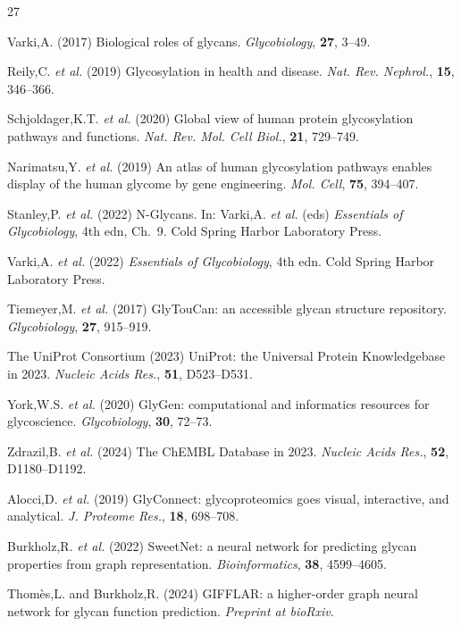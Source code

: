 \documentclass[11pt,a4paper]{ltjsarticle}
\begin{document}
\begin{thebibliography}{27}

Varki,A. (2017) Biological roles of glycans. \textit{Glycobiology}, \textbf{27}, 3--49.

Reily,C. \textit{et al.} (2019) Glycosylation in health and disease. \textit{Nat. Rev. Nephrol.}, \textbf{15}, 346--366.

Schjoldager,K.T. \textit{et al.} (2020) Global view of human protein glycosylation pathways and functions. \textit{Nat. Rev. Mol. Cell Biol.}, \textbf{21}, 729--749.

Narimatsu,Y. \textit{et al.} (2019) An atlas of human glycosylation pathways enables display of the human glycome by gene engineering. \textit{Mol. Cell}, \textbf{75}, 394--407.

Stanley,P. \textit{et al.} (2022) N-Glycans. In: Varki,A. \textit{et al.} (eds) \textit{Essentials of Glycobiology}, 4th edn, Ch.~9. Cold Spring Harbor Laboratory Press.

Varki,A. \textit{et al.} (2022) \textit{Essentials of Glycobiology}, 4th edn. Cold Spring Harbor Laboratory Press.

Tiemeyer,M. \textit{et al.} (2017) GlyTouCan: an accessible glycan structure repository. \textit{Glycobiology}, \textbf{27}, 915--919.

The UniProt Consortium (2023) UniProt: the Universal Protein Knowledgebase in 2023. \textit{Nucleic Acids Res.}, \textbf{51}, D523--D531.

York,W.S. \textit{et al.} (2020) GlyGen: computational and informatics resources for glycoscience. \textit{Glycobiology}, \textbf{30}, 72--73.

Zdrazil,B. \textit{et al.} (2024) The ChEMBL Database in 2023. \textit{Nucleic Acids Res.}, \textbf{52}, D1180--D1192.

Alocci,D. \textit{et al.} (2019) GlyConnect: glycoproteomics goes visual, interactive, and analytical. \textit{J. Proteome Res.}, \textbf{18}, 698--708.

Burkholz,R. \textit{et al.} (2022) SweetNet: a neural network for predicting glycan properties from graph representation. \textit{Bioinformatics}, \textbf{38}, 4599--4605.

Thom\`es,L. and Burkholz,R. (2024) GIFFLAR: a higher-order graph neural network for glycan function prediction. \textit{Preprint at bioRxiv}.


\end{thebibliography}
\end{document}
